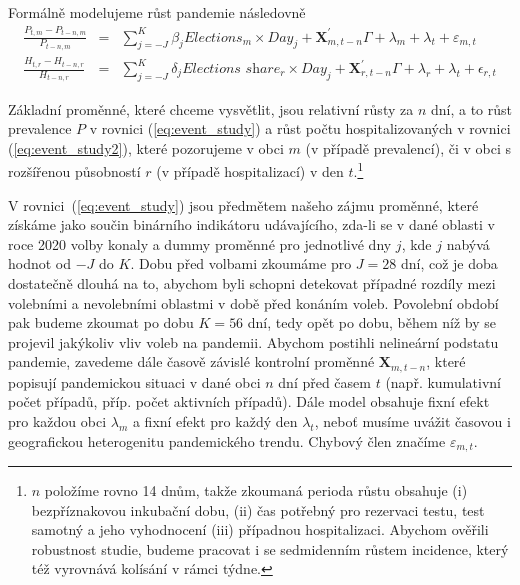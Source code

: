 Formálně modelujeme růst pandemie následovně
\begin{eqnarray}
\label{eq:event_study}
\frac{P_{t,m} - P_{t-n,m}}{P_{t-n,m}} &=& \sum_{j=-J}^{K} \beta_j \textit{Elections}_m \times Day_j + \textbf{X}_{m,t-n}^{'}\Gamma + \lambda_{m} + \lambda_{t} + \varepsilon_{m,t}
\\
\label{eq:event_study2}
\frac{H_{t,r} - H_{t-n,r}}{H_{t-n,r}} &=& \sum_{j=-J}^{K} \delta_j \textit{Elections share}_r \times Day_j + \textbf{X}_{r,t-n}^{'}\Gamma + \lambda_{r} + \lambda_{t} + \epsilon_{r,t}
\end{eqnarray}

Základní proměnné, které chceme vysvětlit, jsou relativní růsty za $n$ dní, a to růst prevalence $P$ v rovnici (\ref{eq:event_study}) a růst počtu hospitalizovaných v rovnici (\ref{eq:event_study2}), které pozorujeme v obci $m$ (v případě prevalencí), či v obci s rozšířenou působností $r$ (v případě hospitalizací) v den $t$.\footnote{$n$ položíme rovno 14 dnům, takže zkoumaná perioda růstu obsahuje
(i) bezpříznakovou inkubační dobu\cite{lauer_et_al2020}, (ii) čas potřebný pro rezervaci testu, test samotný a jeho vyhodnocení (iii) případnou hospitalizaci. Abychom ověřili robustnost studie, budeme pracovat i se sedmidenním růstem incidence, který též vyrovnává kolísání v rámci týdne.}


V rovnici~(\ref{eq:event_study}) jsou předmětem našeho zájmu proměnné, které získáme jako součin binárního indikátoru udávajícího, zda-li se v dané oblasti v roce 2020 volby konaly a dummy proměnné pro jednotlivé dny $j$, kde $j$ nabývá hodnot od $-J$ do $K$. 
Dobu před volbami zkoumáme pro $J=28$ dní, což je doba dostatečně dlouhá na to, abychom byli schopni detekovat případné rozdíly mezi volebními a nevolebními oblastmi v době před konáním voleb. Povolební období pak budeme zkoumat po dobu $K=56$ dní, tedy opět po dobu, během níž by se projevil jakýkoliv vliv voleb na pandemii. Abychom postihli nelineární podstatu pandemie, zavedeme dále časově závislé kontrolní proměnné $\textbf{X}_{m,t-n}$, které popisují pandemickou situaci v dané obci $n$ dní před časem $t$ (např. kumulativní počet případů, příp. počet aktivních případů). Dále model obsahuje fixní efekt pro každou obci $\lambda_{m}$ a fixní efekt pro každý den $\lambda_{t}$, neboť musíme uvážit časovou i geografickou heterogenitu pandemického trendu. Chybový člen značíme
 $\varepsilon_{m,t}$.

